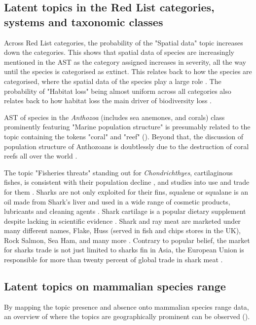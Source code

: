 \subsection{Latent topics in the Red List categories, systems and taxonomic classes}

Across Red List categories, the probability of the "Spatial data" topic increases down the categories. This shows that spatial data of species are increasingly mentioned in the AST as the category assigned increases in severity, all the way until the species is categorised as extinct. This relates back to how the species are categorised, where the spatial data of the species play a large role \parencite{iucn2012}. The probability of "Habitat loss" being almost uniform across all categories also relates back to how habitat loss the main driver of biodiversity loss \parencite{diaz2019pervasive, pimm2014biodiversity}.

AST of species in the \textit{Anthozoa} (includes sea anemones, and corals) class prominently featuring "Marine population structure" is presumably related to the topic containing the tokens "coral" and "reef" (). Beyond that, the discussion of population structure of Anthozoans is doubtlessly due to the destruction of coral reefs all over the world \parencite{Johnson2020CoralRD,hoegh2007coral,hughes2007phase,hughes2003climate}.

The topic "Fisheries threats" standing out for \textit{Chondrichthyes}, cartilaginous fishes, is consistent with their population decline \parencite{pacoureau2021half}, and studies into use and trade for them \parencite{stevens2000effects}. Sharks are not only exploited for their fins, squalene or squalane is an oil made from Shark's liver and used in a wide range of cosmetic products, lubricants and cleaning agents \parencite{naziri2011squalene,vannuccini1999shark,gopakumar1986squalene}. Shark cartilage is a popular dietary supplement despite lacking in scientific evidence \parencite{utsunomiya2003shark}. Shark and ray meat are marketed under many different names, Flake, Huss (served in fish and chips stores in the UK), Rock Salmon, Sea Ham, and many more \parencite{vannuccini1999shark}. Contrary to popular belief, the market for sharks trade is not just limited to sharks fin in Asia, the European Union is responsible for more than twenty percent of global trade in shark meat \parencite{wwf2021shark}.

\subsection{Latent topics on mammalian species range}
By mapping the topic presence and absence onto mammalian species range data, an overview of where the topics are geographically prominent can be observed ().

